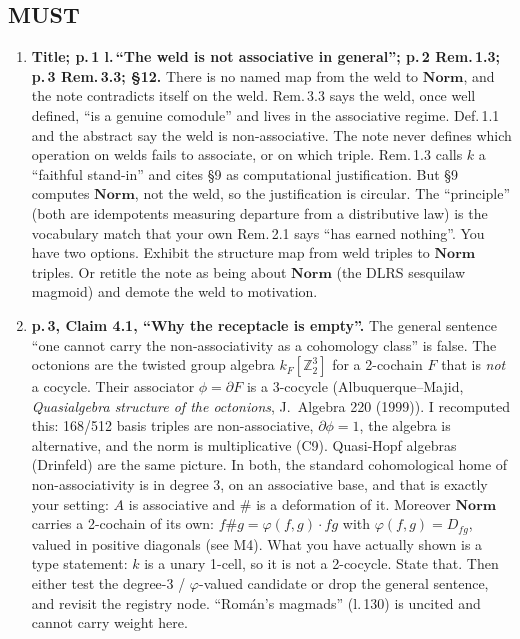\documentclass[11pt]{article}
\newcommand{\Norm}{\mathbf{Norm}}
\begin{document}
\subsection*{MUST}
\begin{enumerate}[label=\textbf{M\arabic*.},leftmargin=*]
\item \textbf{Title; p.\,1 l.\,``The weld is not associative in general''; p.\,2 Rem.\,1.3; p.\,3
  Rem.\,3.3; \S12.} There is no named map from the weld to $\Norm$, and the note contradicts itself on
  the weld. Rem.\,3.3 says the weld, once well defined, ``is a genuine comodule'' and lives in the
  associative regime. Def.\,1.1 and the abstract say the weld is non-associative. The note never
  defines which operation on welds fails to associate, or on which triple. Rem.\,1.3 calls $k$ a
  ``faithful stand-in'' and cites \S9 as computational justification. But \S9 computes $\Norm$, not the
  weld, so the justification is circular. The ``principle'' (both are idempotents measuring departure
  from a distributive law) is the vocabulary match that your own Rem.\,2.1 says ``has earned
  nothing''. You have two options. Exhibit the structure map from weld triples to $\Norm$ triples.
  Or retitle the note as being about $\Norm$ (the DLRS sesquilaw magmoid) and demote the weld to
  motivation.
\item \textbf{p.\,3, Claim 4.1, ``Why the receptacle is empty''.} The general sentence ``one cannot
  carry the non-associativity as a cohomology class'' is false. The octonions are the twisted group
  algebra $k_F[\mathbb{Z}_2^3]$ for a 2-cochain $F$ that is \emph{not} a cocycle. Their associator
  $\phi=\partial F$ is a 3-cocycle (Albuquerque--Majid, \emph{Quasialgebra structure of the
  octonions}, J.\ Algebra 220 (1999)). I recomputed this: 168/512 basis triples are non-associative,
  $\partial\phi=1$, the algebra is alternative, and the norm is multiplicative (C9). Quasi-Hopf
  algebras (Drinfeld) are the same picture. In both, the standard cohomological home of
  non-associativity is in degree 3, on an associative base, and that is exactly your setting: $A$ is
  associative and $\#$ is a deformation of it. Moreover $\Norm$ carries a 2-cochain of its own:
  $f\#g=\varphi(f,g)\cdot fg$ with $\varphi(f,g)=D_{fg}$, valued in positive diagonals (see M4). What
  you have actually shown is a type statement: $k$ is a unary 1-cell, so it is not a 2-cocycle. State
  that. Then either test the degree-3 / $\varphi$-valued candidate or drop the general sentence, and
  revisit the registry node. ``Román's magmads'' (l.\,130) is uncited and cannot carry weight here.

\end{enumerate}
\end{document}
